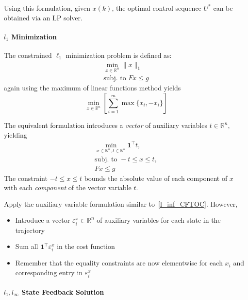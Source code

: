 Using this formulation, given $x(k)$, the optimal control sequence $U^*$ can be obtained via an LP solver.

\paragraph[l1 Minimization]{$l_{1}$ Minimization}

The constrained \(\ell_1\) minimization problem is defined as:
\begin{gather*}
    \min_{x \in \mathbb{R}^n} \|x\|_1 \\
    \text{subj.\ to } Fx \leq g
\end{gather*}
again using the maximum of linear functions method yields
\begin{equation*}
    \min_{x \in \mathbb{R}^n} \left[ \sum_{i=1}^{m} \max \{x_i, -x_i\} \right]
\end{equation*}

\newpar{}

The equivalent formulation introduces a \textit{vector} of auxiliary variables $t \in \mathbb{R}^n$, yielding
\begin{gather*}
    \min_{x \in \mathbb{R}^n, t \in \mathbb{R}^n} \mathbf{1}^\top t, \\
    \text{subj.\ to } -t \leq x \leq t, \\
    Fx \leq g
\end{gather*}
The constraint $-t \leq x \leq t$ bounds the absolute value of each component of $x$ with each \textit{component} of the vector variable $t$.

\newpar{}

Apply the auxiliary variable formulation similar to~\ref{l_inf_CFTOC}. However,
\begin{itemize}
    \item Introduce a vector $\varepsilon_i^x \in \mathbb{R}^n$ of auxiliary variables for each state in the trajectory
    \item Sum all $\mathbf{1}^\top \varepsilon_i^x$ in the cost function
    \item Remember that the equality constraints are now elementwise for each $x_i$ and corresponding entry in $\varepsilon_i^x$
\end{itemize}

\paragraph[l1, linf State Feedback Solution]{$l_{1}, l_{\infty}$ State Feedback Solution}

